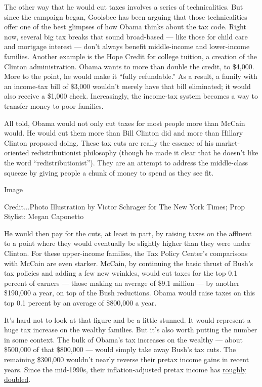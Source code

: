 The other way that he would cut taxes involves a series of
technicalities. But since the campaign began, Goolsbee has been arguing
that those technicalities offer one of the best glimpses of how Obama
thinks about the tax code. Right now, several big tax breaks that sound
broad-based --- like those for child care and mortgage interest ---
don't always benefit middle-income and lower-income families. Another
example is the Hope Credit for college tuition, a creation of the
Clinton administration. Obama wants to more than double the credit, to
\$4,000. More to the point, he would make it ``fully refundable.'' As a
result, a family with an income-tax bill of \$3,000 wouldn't merely have
that bill eliminated; it would also receive a \$1,000 check.
Increasingly, the income-tax system becomes a way to transfer money to
poor families.

All told, Obama would not only cut taxes for most people more than
McCain would. He would cut them more than Bill Clinton did and more than
Hillary Clinton proposed doing. These tax cuts are really the essence of
his market-oriented redistributionist philosophy (though he made it
clear that he doesn't like the word ``redistributionist''). They are an
attempt to address the middle-class squeeze by giving people a chunk of
money to spend as they see fit.

Image

Credit...Photo Illustration by Victor Schrager for The New York Times;
Prop Stylist: Megan Caponetto

He would then pay for the cuts, at least in part, by raising taxes on
the affluent to a point where they would eventually be slightly higher
than they were under Clinton. For these upper-income families, the Tax
Policy Center's comparisons with McCain are even starker. McCain, by
continuing the basic thrust of Bush's tax policies and adding a few new
wrinkles, would cut taxes for the top 0.1 percent of earners --- those
making an average of \$9.1 million --- by another \$190,000 a year, on
top of the Bush reductions. Obama would raise taxes on this top 0.1
percent by an average of \$800,000 a year.

It's hard not to look at that figure and be a little stunned. It would
represent a huge tax increase on the wealthy families. But it's also
worth putting the number in some context. The bulk of Obama's tax
increases on the wealthy --- about \$500,000 of that \$800,000 --- would
simply take away Bush's tax cuts. The remaining \$300,000 wouldn't
nearly reverse their pretax income gains in recent years. Since the
mid-1990s, their inflation-adjusted pretax income has
\href{http://elsa.berkeley.edu/~saez/}{roughly doubled}.

